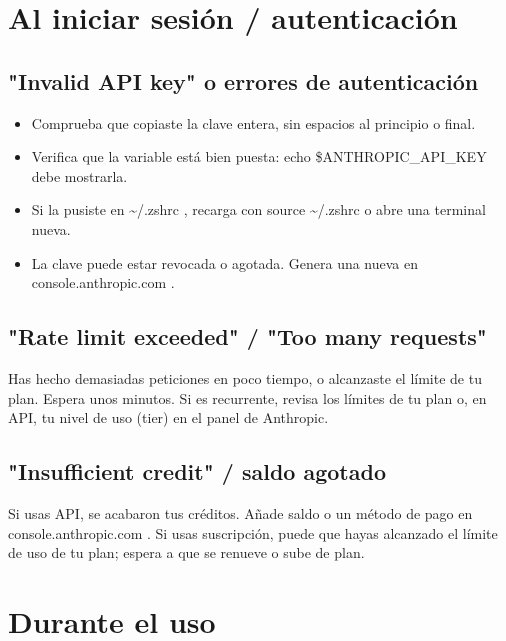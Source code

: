 \documentclass[11pt,a4paper]{book}
\begin{document}
\section{Al iniciar sesión / autenticación}
\subsection{"Invalid API key" o errores de autenticación}
\begin{itemize}\item Comprueba que copiaste la clave entera, sin espacios al principio o final.\end{itemize}
\begin{itemize}\item Verifica que la variable está bien puesta: echo \$ANTHROPIC\_API\_KEY debe mostrarla.\end{itemize}
\begin{itemize}\item Si la pusiste en \textasciitilde{}/.zshrc , recarga con source \textasciitilde{}/.zshrc o abre una terminal nueva.\end{itemize}
\begin{itemize}\item La clave puede estar revocada o agotada. Genera una nueva en console.anthropic.com .\end{itemize}
\subsection{"Rate limit exceeded" / "Too many requests"}
Has hecho demasiadas peticiones en poco tiempo, o alcanzaste el límite de tu plan. Espera unos minutos. Si es recurrente, revisa los límites de tu plan o, en API, tu nivel de uso (tier) en el panel de Anthropic.

\subsection{"Insufficient credit" / saldo agotado}
Si usas API, se acabaron tus créditos. Añade saldo o un método de pago en console.anthropic.com . Si usas suscripción, puede que hayas alcanzado el límite de uso de tu plan; espera a que se renueve o sube de plan.

\section{Durante el uso}
\end{document}
